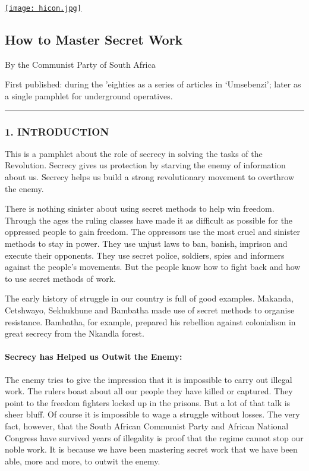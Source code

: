 \href{/indextrue.html}{\texttt{[image: hicon.jpg]}}

\subsection{How to Master Secret Work}

By the Communist Party of South Africa

{First published}: during the 'eighties as a series of articles in
`Umsebenzi'; later as a single pamphlet for underground operatives.

\begin{center}\rule{0.5\linewidth}{\linethickness}\end{center}

\subsubsection{1. INTRODUCTION}

This is a pamphlet about the role of secrecy in solving the tasks of the
Revolution. Secrecy gives us protection by starving the enemy of
information about us. Secrecy helps us build a strong revolutionary
movement to overthrow the enemy.

There is nothing sinister about using secret methods to help win
freedom. Through the ages the ruling classes have made it as difficult
as possible for the oppressed people to gain freedom. The oppressors use
the most cruel and sinister methods to stay in power. They use unjust
laws to ban, banish, imprison and execute their opponents. They use
secret police, soldiers, spies and informers against the people's
movements. But the people know how to fight back and how to use secret
methods of work.

The early history of struggle in our country is full of good examples.
Makanda, Cetshwayo, Sekhukhune and Bambatha made use of secret methods
to organise resistance. Bambatha, for example, prepared his rebellion
against colonialism in great secrecy from the Nkandla forest.

\paragraph{Secrecy has Helped us Outwit the Enemy:}

The enemy tries to give the impression that it is impossible to carry
out illegal work. The rulers boast about all our people they have killed
or captured. They point to the freedom fighters locked up in the
prisons. But a lot of that talk is sheer bluff. Of course it is
impossible to wage a struggle without losses. The very fact, however,
that the South African Communist Party and African National Congress
have survived years of illegality is proof that the regime cannot stop
our noble work. It is because we have been mastering secret work that we
have been able, more and more, to outwit the enemy.

